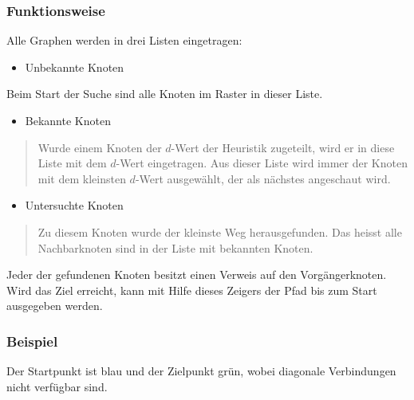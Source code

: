 \subsubsection{Funktionsweise}

Alle Graphen werden in drei Listen eingetragen:

\begin{itemize}
\item Unbekannte Knoten
\end{itemize}

Beim Start der Suche sind alle Knoten im Raster in dieser Liste.

\begin{itemize}
\item Bekannte Knoten
\end{itemize}

\begin{quote}
Wurde einem Knoten der $d$-Wert der Heuristik zugeteilt, wird er in diese
Liste mit dem $d$-Wert eingetragen. Aus dieser Liste wird immer der Knoten
mit dem kleinsten $d$-Wert ausgewählt, der als nächstes angeschaut wird.
\end{quote}

\begin{itemize}
\item Untersuchte Knoten
\end{itemize}

\begin{quote}
Zu diesem Knoten wurde der kleinste Weg herausgefunden. Das heisst alle
Nachbarknoten sind in der Liste mit bekannten Knoten.
\end{quote}

Jeder der gefundenen Knoten besitzt einen Verweis auf den
Vorgängerknoten. Wird das Ziel erreicht, kann mit Hilfe dieses Zeigers
der Pfad bis zum Start ausgegeben werden.
\cite[Schmidt, Fuchs]{asterngeo}

\subsubsection{Beispiel}

Der Startpunkt ist blau und der Zielpunkt grün, wobei diagonale Verbindungen nicht verfügbar sind.

